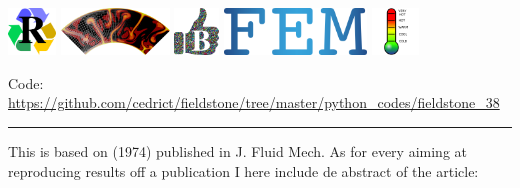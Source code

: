\includegraphics[height=1.25cm]{images/pictograms/replication}
\includegraphics[height=1.25cm]{images/pictograms/aspect_logo}
\includegraphics[height=1.25cm]{images/pictograms/benchmark}
\includegraphics[height=1.25cm]{images/pictograms/FEM}
\includegraphics[height=1.25cm]{images/pictograms/temperature}




\begin{center}
\inpython
{\small Code: \url{https://github.com/cedrict/fieldstone/tree/master/python_codes/fieldstone_38}}
\end{center}

\par\noindent\rule{\textwidth}{0.4pt}


This \stone is based on \textcite{mcrw74} (1974) published in J. Fluid Mech.
As for every \stone aiming at reproducing results off a publication I here include de abstract
of the article:

